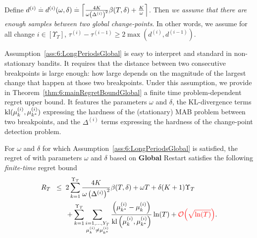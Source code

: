 \begin{assumption}\label{ass:6:LongPeriodsGlobal}
\begin{leftbar}[assumptionbar]  %
    Define
    $d^{(i)} \overset{.}{=} d^{(i)}(\omega,\delta) \overset{.}{=} \Bigl\lceil \frac{4K}{\omega\left(\Delta^{(i)}\right)^2}\beta(T,\delta) + \frac{K}{\omega} \Bigr\rceil$.
    Then \emph{we assume that there are enough samples between two global change-points}.
    In other words, we assume for all change $i \in [\Upsilon_T]$,
    $\tau^{(i)} - \tau^{(i-1)} \geq 2\max (d^{(i)},d^{(i-1)})$.
\end{leftbar}  %
\end{assumption}

Assumption~\ref{ass:6:LongPeriodsGlobal} is easy to interpret and standard in non-stationary bandits.
It requires that the distance between two consecutive breakpoints is large enough: how large depends on the magnitude of the largest change that happen at those two breakpoints.
Under this assumption, we provide in Theorem~\ref{thm:6:mainRegretBoundGlobal} a finite time problem-dependent regret upper bound.
It features the parameters $\omega$ and $\delta$,
the KL-divergence terms $\mathrm{kl}(\mu_k^{(i)},\mu_{k^*}^{(i)})$ expressing the hardness of the (stationary) MAB problem between two breakpoints,
and the $\Delta^{(i)}$ terms expressing the hardness of the change-point detection problem.

\begin{theorem}\label{thm:6:mainRegretBoundGlobal}
\begin{leftbar}[theorembar]  %
    For $\omega$ and $\delta$ for which Assumption~\ref{ass:6:LongPeriodsGlobal} is satisfied, the regret of \GLRklUCB{} with parameters $\omega$ and $\delta$ based on \textbf{Global} Restart satisfies the following \emph{finite-time} regret bound
    \begin{align}
        R_T \;\; \leq \;\; & 2\sum_{k=1}^{\Upsilon_T} \frac{4K}{\omega \left(\Delta^{(i)}\right)^2}\beta(T,\delta) +\omega T + \delta (K+1)\Upsilon_T \\
        & + \sum_{k=1}^{\Upsilon_T}\sum_{\substack{i = 1,\dots,Y_T\\\mu_k^{(i)} \neq \mu_{k^*}^{(i)}}} \frac{\left( \mu_{k^*}^{(i)}-\mu_k^{(i)}\right)}{\mathrm{kl}\left(\mu_k^{(i)},\mu_{k^*}^{(i)}\right)}\ln(T) + \textcolor{red}{\mathop{}\mathopen{}\mathcal{O}\mathopen{}\left(\sqrt{\ln(T)}\right)}. \nonumber
    \end{align}
\end{leftbar}  %
\end{theorem}


